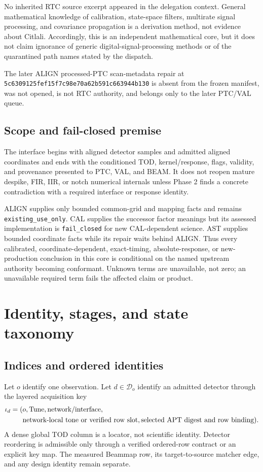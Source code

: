 \documentclass[11pt]{article}
\newcommand{\code}[1]{\nolinkurl{#1}}
\begin{document}
No inherited RTC source excerpt appeared in the delegation context.  General
mathematical knowledge of calibration, state-space filters, multirate signal
processing, and covariance propagation is a derivation method, not evidence
about Citlali.  Accordingly, this is an independent mathematical core, but it
does not claim ignorance of generic digital-signal-processing methods or of
the quarantined path names stated by the dispatch.

The later ALIGN processed-PTC scan-metadata repair at
\code{5c6309125fef15f7c98e70a62b591c663944b130} is absent from the frozen
manifest, was not opened, is not RTC authority, and belongs only to the later
PTC/VAL queue.

\subsection{Scope and fail-closed premise}

The interface begins with aligned detector samples and admitted aligned
coordinates and ends with the conditioned TOD, kernel/response, flags,
validity, and provenance presented to PTC, VAL, and BEAM.  It does not reopen
mature despike, FIR, IIR, or notch numerical internals unless Phase 2 finds a
concrete contradiction with a required interface or response identity.

ALIGN supplies only bounded common-grid and mapping facts and remains
\code{existing_use_only}.  CAL supplies the successor factor meanings but its
assessed implementation is \code{fail_closed} for new CAL-dependent science.
AST supplies bounded coordinate facts while its repair waits behind ALIGN.
Thus every calibrated, coordinate-dependent, exact-timing, absolute-response,
or new-production conclusion in this core is conditional on the named
upstream authority becoming conformant.  Unknown terms are unavailable, not
zero; an unavailable required term fails the affected claim or product.

\section{Identity, stages, and state taxonomy}

\subsection{Indices and ordered identities}

Let $o$ identify one observation.  Let $d\in\mathcal D_o$ identify an admitted
detector through the layered acquisition key
\[
 \begin{aligned}
  \iota_d=(&o,\hbox{Tune},\hbox{network/interface},\\
            &\hbox{network-local tone or verified row slot},
              \hbox{selected APT digest and row binding}).
 \end{aligned}
\]
A dense global TOD column is a locator, not scientific identity.  Detector
reordering is admissible only through a verified ordered-row contract or an
explicit key map.  The measured Beammap row, its target-to-source matcher
edge, and any design identity remain separate.
\end{document}
